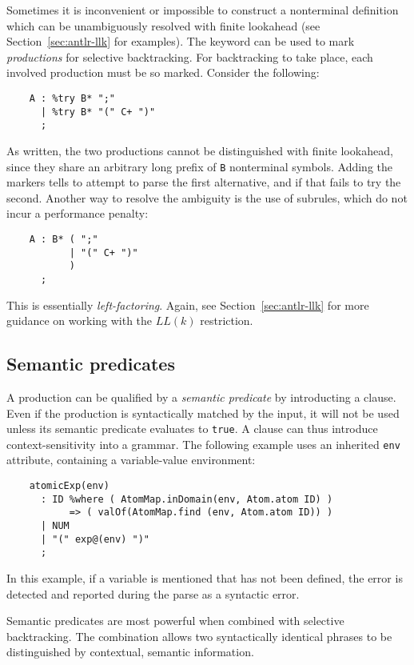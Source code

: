 Sometimes it is inconvenient or impossible to construct a nonterminal definition which can be unambiguously resolved with finite lookahead (see Section~\ref{sec:antlr-llk} for examples).  The  keyword can be used to mark \emph{productions} for selective backtracking.  For backtracking to take place, each involved production must be so marked.  Consider the following:
\begin{verbatim}
    A : %try B* ";"
      | %try B* "(" C+ ")"
      ;
\end{verbatim}
As written, the two productions cannot be distinguished with finite lookahead, since they share an arbitrary long prefix of {\tt B} nonterminal symbols.  Adding the  markers tells \antlr{} to attempt to parse the first alternative, and if that fails to try the second.  Another way to resolve the ambiguity is the use of subrules, which do not incur a performance penalty:
\begin{verbatim}
    A : B* ( ";"
           | "(" C+ ")"
           )
      ;
\end{verbatim}
This is essentially \emph{left-factoring}.  Again, see Section~\ref{sec:antlr-llk} for more guidance on working with the $LL(k)$ restriction.

\subsection{Semantic predicates}

A production can be qualified by a \emph{semantic predicate} by introducting a  clause.  Even if the production is syntactically matched by the input, it will not be used unless its semantic predicate evaluates to {\tt true}.  A  clause can thus introduce context-sensitivity into a grammar.  The following example uses an inherited {\tt env} attribute, containing a variable-value environment:
\begin{verbatim}
    atomicExp(env)
      : ID %where ( AtomMap.inDomain(env, Atom.atom ID) )
           => ( valOf(AtomMap.find (env, Atom.atom ID)) )
      | NUM
      | "(" exp@(env) ")"
      ;
\end{verbatim}
In this example, if a variable is mentioned that has not been defined, the error is detected and reported during the parse as a syntactic error.

Semantic predicates are most powerful when combined with selective backtracking.  The combination allows two syntactically identical phrases to be distinguished by contextual, semantic information.

